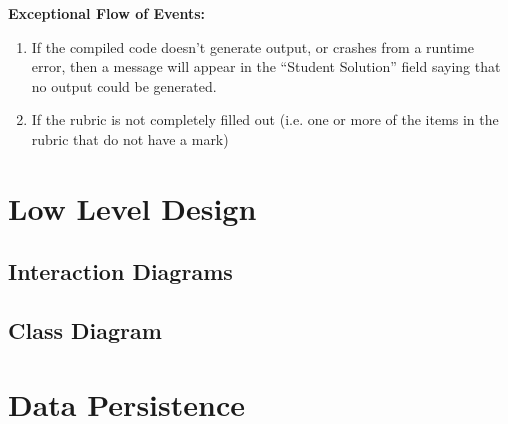 \documentclass{article}
\begin{document}
\textbf{Exceptional Flow of Events:}
\begin{enumerate}
 	\item If the compiled code doesn’t generate output, or crashes from a runtime error, then a message will appear in the “Student Solution” field saying that  no output could be generated.
	\item If the rubric is not completely filled out (i.e. one or more of the items in the rubric that do not have a mark)
\end{enumerate}

\section{Low Level Design}
\subsection{Interaction Diagrams}
\subsection{Class Diagram}

\section{Data Persistence}
\end{document}
